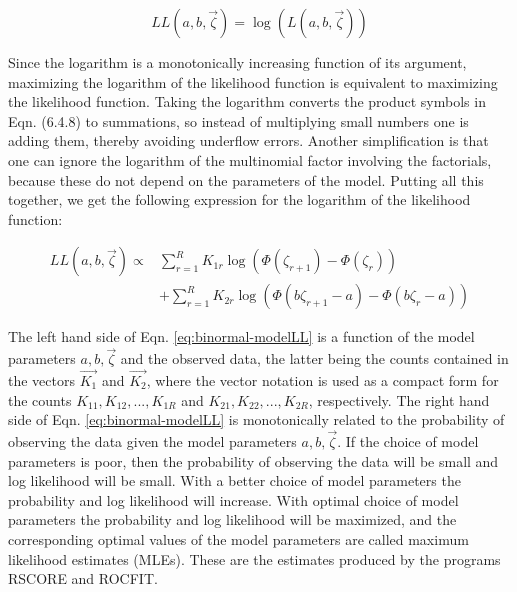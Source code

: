 \documentclass[
]{book}
\begin{document}
\begin{equation} 
LL\left ( a,b,\overrightarrow{\zeta} \right )=\log \left ( L\left ( a,b,\overrightarrow{\zeta} \right ) \right )
\label{eq:binormal-model-ll}
\end{equation}

Since the logarithm is a monotonically increasing function of its argument, maximizing the logarithm of the likelihood function is equivalent to maximizing the likelihood function. Taking the logarithm converts the product symbols in Eqn. (6.4.8) to summations, so instead of multiplying small numbers one is adding them, thereby avoiding underflow errors. Another simplification is that one can ignore the logarithm of the multinomial factor involving the factorials, because these do not depend on the parameters of the model. Putting all this together, we get the following expression for the logarithm of the likelihood function:

\begin{equation} 
\begin{split}
LL\left ( a,b,\overrightarrow{\zeta} \right ) \propto& \sum_{r=1}^{R} K_{1r}\log \left ( \Phi\left ( \zeta_{r+1} \right ) - \Phi\left ( \zeta_r \right ) \right ) \\
&+ \sum_{r=1}^{R} K_{2r}\log \left ( \Phi\left (b \zeta_{r+1} - a \right ) - \Phi\left ( b \zeta_r - a \right ) \right ) 
\end{split}
\label{eq:binormal-modelLL}
\end{equation}

The left hand side of Eqn. \eqref{eq:binormal-modelLL} is a function of the model parameters \(a,b,\overrightarrow{\zeta}\) and the observed data, the latter being the counts contained in the vectors \(\overrightarrow{K_1}\) and \(\overrightarrow{K_2}\), where the vector notation is used as a compact form for the counts \(K_{11},K_{12},...,K_{1R}\) and \(K_{21},K_{22},...,K_{2R}\), respectively. The right hand side of Eqn. \eqref{eq:binormal-modelLL} is monotonically related to the probability of observing the data given the model parameters \(a,b,\overrightarrow{\zeta}\). If the choice of model parameters is poor, then the probability of observing the data will be small and log likelihood will be small. With a better choice of model parameters the probability and log likelihood will increase. With optimal choice of model parameters the probability and log likelihood will be maximized, and the corresponding optimal values of the model parameters are called maximum likelihood estimates (MLEs). These are the estimates produced by the programs RSCORE and ROCFIT.
\end{document}
